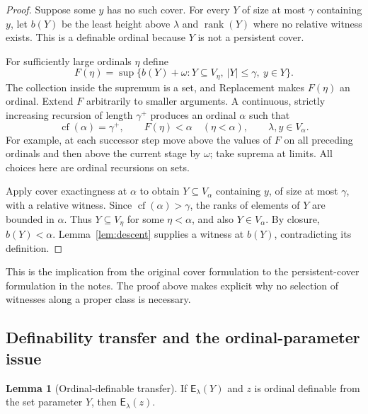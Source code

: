 \documentclass[11pt,letterpaper]{article}
\theoremstyle{definition}
\newtheorem{lemma}[definition]{Lemma}
\newcommand{\cf}{\operatorname{cf}}
\newcommand{\rank}{\operatorname{rank}}
\newcommand{\Erel}{\mathsf{E}}
\begin{document}
\begin{proof}
Suppose some $y$ has no such cover. For every $Y$ of size at most $\gamma$ containing $y$, let $b(Y)$ be the least height above $\lambda$ and $\rank(Y)$ where no relative witness exists. This is a definable ordinal because $Y$ is not a persistent cover.

For sufficiently large ordinals $\eta$ define
\[
 F(\eta)=\sup\bigl\{b(Y)+\omega:
       Y\subseteq V_\eta,\ |Y|\leq\gamma,\ y\in Y\bigr\}.
\]
The collection inside the supremum is a set, and Replacement makes $F(\eta)$ an ordinal. Extend $F$ arbitrarily to smaller arguments. A continuous, strictly increasing recursion of length $\gamma^+$ produces an ordinal $\alpha$ such that
\[
 \cf(\alpha)=\gamma^+,
 \qquad F(\eta)<\alpha\quad(\eta<\alpha),
 \qquad \lambda, y\in V_\alpha.
\]
For example, at each successor step move above the values of $F$ on all preceding ordinals and then above the current stage by $\omega$; take suprema at limits. All choices here are ordinal recursions on sets.

Apply cover exactingness at $\alpha$ to obtain $Y\subseteq V_\alpha$ containing $y$, of size at most $\gamma$, with a relative witness. Since $\cf(\alpha)>\gamma$, the ranks of elements of $Y$ are bounded in $\alpha$. Thus $Y\subseteq V_\eta$ for some $\eta<\alpha$, and also $Y\in V_\alpha$. By closure, $b(Y)<\alpha$. Lemma~\ref{lem:descent} supplies a witness at $b(Y)$, contradicting its definition.
\end{proof}

This is the implication from the original cover formulation to the persistent-cover formulation in the notes.\cite{cover} The proof above makes explicit why no selection of witnesses along a proper class is necessary.

\subsection{Definability transfer and the ordinal-parameter issue}

\begin{lemma}[Ordinal-definable transfer]\label{lem:transfer}
If $\Erel_\lambda(Y)$ and $z$ is ordinal definable from the set parameter $Y$, then $\Erel_\lambda(z)$.
\end{lemma}
\end{document}
